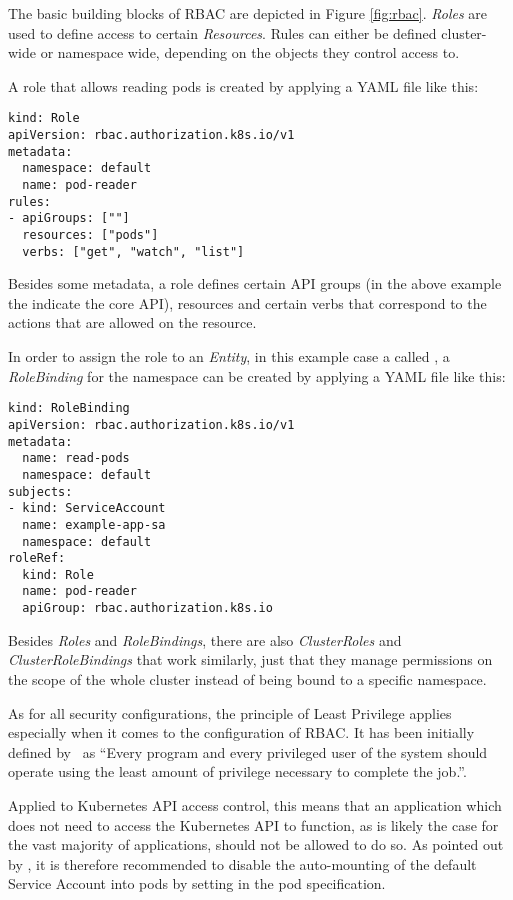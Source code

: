 The basic building blocks of \ac{RBAC} are depicted in Figure \ref{fig:rbac}. \textit{Roles} are used to define access to certain \textit{Resources}. Rules can either be defined cluster-wide or namespace wide, depending on the objects they control access to.

A role that allows reading pods is created by applying a YAML file like this: 

\begin{verbatim}
kind: Role
apiVersion: rbac.authorization.k8s.io/v1
metadata:
  namespace: default
  name: pod-reader
rules:
- apiGroups: [""]
  resources: ["pods"]
  verbs: ["get", "watch", "list"]
\end{verbatim}

Besides some metadata, a role defines certain API groups (in the above example the  indicate the core API), resources and certain verbs that correspond to the actions that are allowed on the resource. 

In order to assign the role to an \textit{Entity}, in this example case a  called , a \textit{RoleBinding} for the namespace  can be created by applying a YAML file like this:

\begin{verbatim}
kind: RoleBinding
apiVersion: rbac.authorization.k8s.io/v1
metadata:
  name: read-pods
  namespace: default
subjects:
- kind: ServiceAccount
  name: example-app-sa 
  namespace: default
roleRef:
  kind: Role
  name: pod-reader
  apiGroup: rbac.authorization.k8s.io
\end{verbatim}

Besides \textit{Roles} and \textit{RoleBindings}, there are also \textit{ClusterRoles} and \textit{ClusterRoleBindings} that work similarly, just that they manage permissions on the scope of the whole cluster instead of being bound to a specific namespace.

As for all security configurations, the principle of Least Privilege applies especially when it comes to the configuration of \ac{RBAC}. It has been initially defined by~\textcite{leastPrivilege} as \enquote{Every program and every privileged user of the system should operate using the least amount of privilege necessary to complete the job.}. 

Applied to Kubernetes API access control, this means that an application which does not need to access the Kubernetes API to function, as is likely the case for the vast majority of applications, should not be allowed to do so. As pointed out by \textcite{kubernetessecurity}, it is therefore recommended to disable the auto-mounting of the default Service Account into pods by setting  in the pod specification. 

